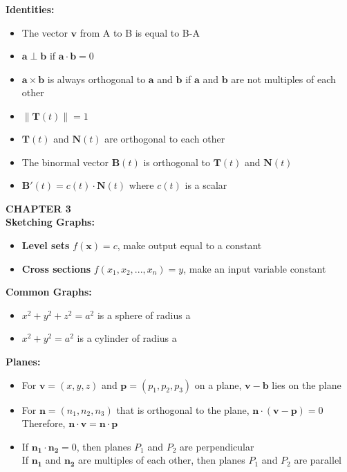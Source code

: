 \documentclass[12pt, letterpaper]{article}
\begin{document}
\textbf{Identities:}
\begin{itemize}
    \item The vector $\mathbf{v}$ from A to B is equal to B-A
    \item $\mathbf{a} \perp \mathbf{b}$ if $\mathbf{a} \cdot \mathbf{b} = 0$
    \item $\mathbf{a} \times \mathbf{b}$ is always orthogonal to $\mathbf{a}$ and $\mathbf{b}$ if $\mathbf{a}$ and $\mathbf{b}$ are not multiples of each other
    \item $\|\mathbf{T}(t)\| = 1$
    \item $\mathbf{T}(t)$ and $\mathbf{N}(t)$ are orthogonal to each other
    \item The binormal vector $\mathbf{B}(t)$ is orthogonal to $\mathbf{T}(t)$ and $\mathbf{N}(t)$
    \item $\mathbf{B}'(t) = c(t) \cdot \mathbf{N}(t)$ where $c(t)$ is a scalar \\
\end{itemize}

\textbf{CHAPTER 3} \\

\textbf{Sketching Graphs:}
\begin{itemize}
    \item \textbf{Level sets} $f(\mathbf{x}) = c$, make output equal to a constant
    \item \textbf{Cross sections} $f(x_1, x_2,..., x_n) = y$, make an input variable constant \\
\end{itemize}

\textbf{Common Graphs:}
\begin{itemize}
    \item $x^2 + y^2 + z^2 = a^2$ is a sphere of radius a
    \item $x^2 + y^2 = a^2$ is a cylinder of radius a \\
\end{itemize}

\textbf{Planes:}
\begin{itemize}
    \item For $\mathbf{v} = (x, y, z)$ and $\mathbf{p} = (p_1, p_2, p_3)$ on a plane, $\mathbf{v} - \mathbf{b}$ lies on the plane
    \item For $\mathbf{n} = (n_1, n_2, n_3)$ that is orthogonal to the plane, $\mathbf{n} \cdot (\mathbf{v} - \mathbf{p}) = 0$ \\ Therefore, $\mathbf{n} \cdot \mathbf{v} = \mathbf{n} \cdot \mathbf{p}$
    \item If $\mathbf{n_1} \cdot \mathbf{n_2} = 0$, then planes $P_1$ and $P_2$ are perpendicular \\ If $\mathbf{n_1}$ and $\mathbf{n_2}$ are multiples of each other, then planes $P_1$ and $P_2$ are parallel \\
\end{itemize}
\end{document}

